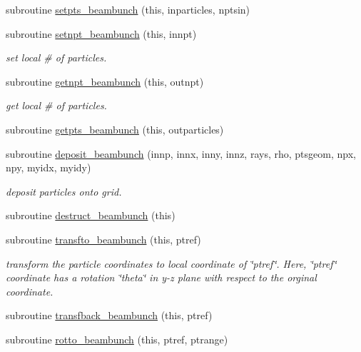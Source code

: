 \begin{DoxyCompactItemize}
subroutine \mbox{\hyperlink{namespacebeambunchclass_a2cf9a1a04b69a4b2509d80522112a3bd}{setpts\+\_\+beambunch}} (this, inparticles, nptsin)
\item 
subroutine \mbox{\hyperlink{namespacebeambunchclass_af1b14b706bd1283ff6c5a7cec4b06c48}{setnpt\+\_\+beambunch}} (this, innpt)
\begin{DoxyCompactList}\small\item\em set local \# of particles. \end{DoxyCompactList}\item 
subroutine \mbox{\hyperlink{namespacebeambunchclass_aec332b229b76111b68db82b20ab2846e}{getnpt\+\_\+beambunch}} (this, outnpt)
\begin{DoxyCompactList}\small\item\em get local \# of particles. \end{DoxyCompactList}\item 
subroutine \mbox{\hyperlink{namespacebeambunchclass_abc601844eaf85727173ebd3ef6d2b256}{getpts\+\_\+beambunch}} (this, outparticles)
\item 
subroutine \mbox{\hyperlink{namespacebeambunchclass_aa0438cba132ce3b2fdc8e053375c0097}{deposit\+\_\+beambunch}} (innp, innx, inny, innz, rays, rho, ptsgeom, npx, npy, myidx, myidy)
\begin{DoxyCompactList}\small\item\em deposit particles onto grid. \end{DoxyCompactList}\item 
subroutine \mbox{\hyperlink{namespacebeambunchclass_a0fe1e4d236f209b18f75b272bf07782d}{destruct\+\_\+beambunch}} (this)
\item 
subroutine \mbox{\hyperlink{namespacebeambunchclass_aef2d76ba15a23896de0838b2001d72b1}{transfto\+\_\+beambunch}} (this, ptref)
\begin{DoxyCompactList}\small\item\em transform the particle coordinates to local coordinate of \char`\"{}ptref\char`\"{}. Here, \char`\"{}ptref\char`\"{} coordinate has a rotation \char`\"{}theta\char`\"{} in y-\/z plane with respect to the orginal coordinate. \end{DoxyCompactList}\item 
subroutine \mbox{\hyperlink{namespacebeambunchclass_a89d32b2a56cd1eb84867e95897af307a}{transfback\+\_\+beambunch}} (this, ptref)
\item 
subroutine \mbox{\hyperlink{namespacebeambunchclass_a05e93a990ca0c8071c035d078ffb7bb0}{rotto\+\_\+beambunch}} (this, ptref, ptrange)

\end{DoxyCompactItemize}
